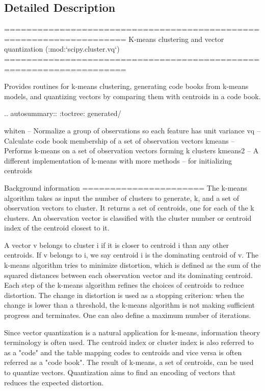 \subsection{Detailed Description}
\begin{DoxyVerb}====================================================================
K-means clustering and vector quantization (:mod:`scipy.cluster.vq`)
====================================================================

Provides routines for k-means clustering, generating code books
from k-means models, and quantizing vectors by comparing them with
centroids in a code book.

.. autosummary::
   :toctree: generated/

   whiten -- Normalize a group of observations so each feature has unit variance
   vq -- Calculate code book membership of a set of observation vectors
   kmeans -- Performs k-means on a set of observation vectors forming k clusters
   kmeans2 -- A different implementation of k-means with more methods
       -- for initializing centroids

Background information
======================
The k-means algorithm takes as input the number of clusters to
generate, k, and a set of observation vectors to cluster.  It
returns a set of centroids, one for each of the k clusters.  An
observation vector is classified with the cluster number or
centroid index of the centroid closest to it.

A vector v belongs to cluster i if it is closer to centroid i than
any other centroids. If v belongs to i, we say centroid i is the
dominating centroid of v. The k-means algorithm tries to
minimize distortion, which is defined as the sum of the squared distances
between each observation vector and its dominating centroid.  Each
step of the k-means algorithm refines the choices of centroids to
reduce distortion. The change in distortion is used as a
stopping criterion: when the change is lower than a threshold, the
k-means algorithm is not making sufficient progress and
terminates. One can also define a maximum number of iterations.

Since vector quantization is a natural application for k-means,
information theory terminology is often used.  The centroid index
or cluster index is also referred to as a "code" and the table
mapping codes to centroids and vice versa is often referred as a
"code book". The result of k-means, a set of centroids, can be
used to quantize vectors. Quantization aims to find an encoding of
vectors that reduces the expected distortion.


\end{DoxyVerb}
